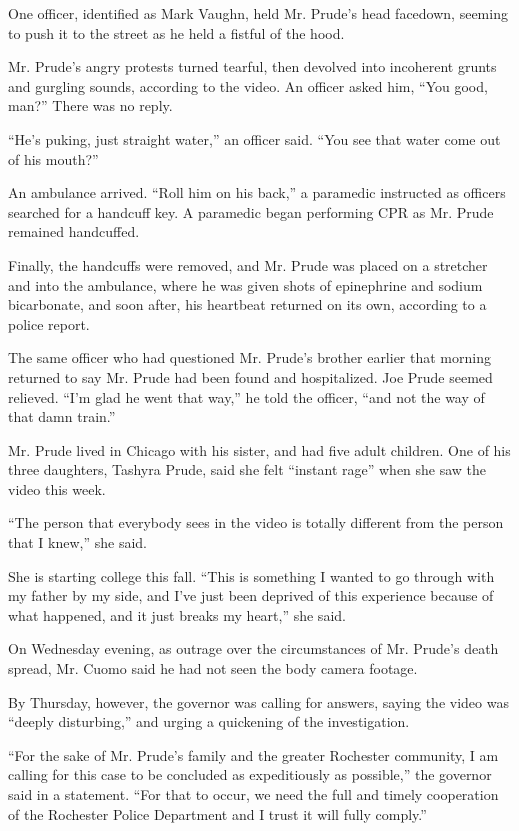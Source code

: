 One officer, identified as Mark Vaughn, held Mr. Prude's head facedown,
seeming to push it to the street as he held a fistful of the hood.

Mr. Prude's angry protests turned tearful, then devolved into incoherent
grunts and gurgling sounds, according to the video. An officer asked
him, ``You good, man?'' There was no reply.

``He's puking, just straight water,'' an officer said. ``You see that
water come out of his mouth?''

An ambulance arrived. ``Roll him on his back,'' a paramedic instructed
as officers searched for a handcuff key. A paramedic began performing
CPR as Mr. Prude remained handcuffed.

Finally, the handcuffs were removed, and Mr. Prude was placed on a
stretcher and into the ambulance, where he was given shots of
epinephrine and sodium bicarbonate, and soon after, his heartbeat
returned on its own, according to a police report.

The same officer who had questioned Mr. Prude's brother earlier that
morning returned to say Mr. Prude had been found and hospitalized. Joe
Prude seemed relieved. ``I'm glad he went that way,'' he told the
officer, ``and not the way of that damn train.''

Mr. Prude lived in Chicago with his sister, and had five adult children.
One of his three daughters, Tashyra Prude, said she felt ``instant
rage'' when she saw the video this week.

``The person that everybody sees in the video is totally different from
the person that I knew,'' she said.

She is starting college this fall. ``This is something I wanted to go
through with my father by my side, and I've just been deprived of this
experience because of what happened, and it just breaks my heart,'' she
said.

On Wednesday evening, as outrage over the circumstances of Mr. Prude's
death spread, Mr. Cuomo said he had not seen the body camera footage.

By Thursday, however, the governor was calling for answers, saying the
video was ``deeply disturbing,'' and urging a quickening of the
investigation.

``For the sake of Mr. Prude's family and the greater Rochester
community, I am calling for this case to be concluded ‎as expeditiously
as possible,'' the governor said in a statement. ``For that to occur, we
need the full and timely cooperation of the Rochester Police Department
and I trust it will fully comply‎.''

